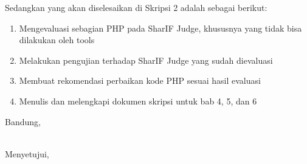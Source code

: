 \documentclass[a4paper,twoside]{article}
\begin{document}
Sedangkan yang akan diselesaikan di Skripsi 2 adalah sebagai berikut:
\begin{enumerate}
\item Mengevaluasi sebagian PHP pada SharIF Judge, khususnya yang tidak bisa dilakukan oleh tools
\item Melakukan pengujian terhadap SharIF Judge yang sudah dievaluasi
\item Membuat rekomendasi perbaikan kode PHP sesuai hasil evaluasi
\item Menulis dan melengkapi dokumen skripsi untuk bab 4, 5, dan 6

\end{enumerate}

\vspace{1cm}
\centering Bandung, \tanggal\\
\vspace{2cm} \nama \\ 
\vspace{1cm}

Menyetujui, \\
\end{document}
